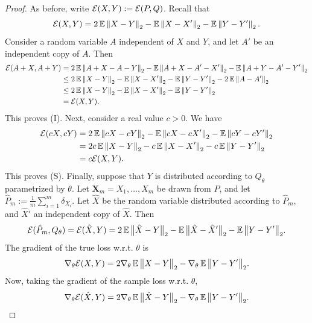 \documentclass{article}
\def \Qtheta {Q_\theta}
\def \batch {\mathbf{X}_m}
\begin{document}
\begin{proof}
As before, write $\mathcal{E}(X, Y) := \mathcal{E}(P, Q)$. Recall that
\begin{equation*}
\cE(X, Y) = 2 \expect \norm{X - Y}_2 - \expect \norm{X - X'}_2 - \expect \norm{Y - Y'}_2 .
\end{equation*}
Consider a random variable $A$ independent of $X$ and $Y$, and let $A'$ be an independent copy of $A$. Then
\begin{align*}
\cE(A + X, A + Y) &= 2 \expect \norm{A + X - A - Y}_2 - \expect \norm{A + X - A' - X'}_2 - \expect \norm{A + Y - A' - Y'}_2 \\
&\le 2 \expect \norm{X - Y}_2 - \expect \norm{X - X'}_2 - \expect \norm{Y - Y'}_2 - 2 \expect \norm{A - A'}_2 \\
&\le 2 \expect \norm{X - Y}_2 - \expect \norm{X - X'}_2 - \expect \norm{Y - Y'}_2 \\
&= \cE(X, Y).
\end{align*}
This proves (I). Next, consider a real value $c > 0$. We have
\begin{align*}
\cE(cX, cY) &= 2 \expect \norm{cX - cY}_2 - \expect \norm{cX - cX'}_2 - \expect \norm{cY - cY'}_2 \\
&= 2 c \expect \norm{X - Y}_2 - c \expect \norm{X - X'}_2 - c \expect \norm{Y - Y'}_2 \\
&= c \cE(X, Y) .
\end{align*}
This proves (S). Finally, suppose that $Y$ is distributed according to $\Qtheta$ parametrized by $\theta$. Let $\batch = X_1, \dots, X_m$ be drawn from $P$, and let $\hat P_m := \tfrac{1}{m} \sum_{i=1}^m \delta_{X_i}$. Let $\hat X$ be the random variable distributed according to $\hat P_m$, and $\hat X'$ an independent copy of $\hat X$. Then
\begin{equation*}
\cE(\hat P_m, \Qtheta) = \cE(\hat X, Y) = 2 \expect \bignorm{\hat X - Y}_2 - \expect \bignorm{\hat X - \hat X'}_2 - \expect \bignorm{Y - Y'}_2 .
\end{equation*}
The gradient of the true loss w.r.t. $\theta$ is
\begin{equation}
\grad_\theta \cE(X, Y) = 2 \grad_\theta \expect \bignorm{X - Y}_2 - \grad_\theta \expect \bignorm{Y - Y'}_2 . \label{eqn:energy_distance_gradient}
\end{equation}
Now, taking the gradient of the sample loss w.r.t. $\theta$,
\begin{equation}
\grad_\theta \cE(\hat X, Y) = 2 \grad_\theta \expect \bignorm{\hat X - Y}_2 - \grad_\theta \expect \bignorm{Y - Y'}_2 . \label{eqn:energy_distance_sample_gradient}

\end{equation}
\end{proof}
\end{document}
